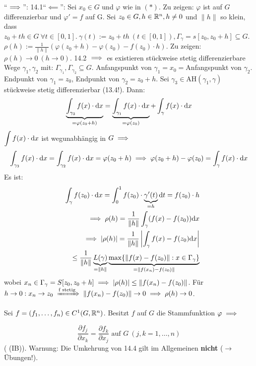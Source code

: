 \documentclass[a4paper,oneside,DIV15,BCOR12mm,chapterprefix=true,headings=onelinechapter]{scrbook}
\begin{document}
\begin{beweis}
"`$\implies$"': 14.1\quad "`$\impliedby$"': Sei $x_0\in G$ und $\varphi$ wie in $(*)$. Zu zeigen: $\varphi$ ist auf $G$ differenzierbar und $\varphi'=f$ auf G. Sei $z_0\in G, h\in\mathbb{R}^n,h\ne 0$ und $\|h\|$ so klein, dass $z_0+th\in G\ \forall t\in[0,1].\ \gamma(t):=z_0+th\ (t\in[0,1]), \Gamma_\gamma=s[z_0, z_0+h]\subseteq G$. $\rho(h):=\frac{1}{\|h\|}(\varphi(z_0+h)-\varphi(z_0)-f(z_0)\cdot h)$. Zu zeigen: $\rho(h)\to 0\ (h\to 0)$. 14.2 $\implies$ es existieren stückweise stetig differenzierbare Wege $\gamma_1, \gamma_2$ mit: $\Gamma_{\gamma_1},\Gamma_{\gamma_2}\subseteq G$. Anfangspunkt von $\gamma_1=x_0=$Anfangspunkt von $\gamma_2$. Endpunkt von $\gamma_1=z_0$, Endpunkt von $\gamma_2=z_0+h$. Sei $\gamma_3\in \text{AH}(\gamma_1,\gamma)$ stückweise stetig differenzierbar (13.4!). Dann: 
$$\underbrace{\displaystyle\int_{\gamma_3}f(x)\cdot\text{d}x}_{=\varphi(z_0+h)}=\underbrace{\displaystyle\int_{\gamma_1}f(x)\cdot\text{d}x}_{=\varphi(z_0)}+\displaystyle\int_{\gamma}f(x)\cdot\text{d}x$$
$\displaystyle\int f(x)\cdot\text{d}x$ ist wegunabhängig in $G\implies$\\
$$\displaystyle\int_{\gamma_3}f(x)\cdot\text{d}x=\displaystyle\int_{\gamma_2}f(x)\cdot\text{d}x=\varphi(z_0+h)\implies\varphi(z_0+h)-\varphi(z_0)=\displaystyle\int_{\gamma}f(x)\cdot\text{d}x$$
Es ist:
\begin{eqnarray*}
&&\displaystyle\int_{\gamma}f(z_0)\cdot\text{d}x=\displaystyle\int_0^1 f(z_0)\cdot\underbrace{\gamma'(t)}_{=h}\text{d}t=f(z_0)\cdot h\\
&&\implies \rho(h)=\frac{1}{\|h\|}\displaystyle\int_{\gamma}(f(x)-f(z_0))\text{d}x\\
&&\implies |\rho(h)|=\frac{1}{\|h\|}\left|\displaystyle\int_{\gamma}f(x)-f(z_0)\text{d}x\right|\\
&&\le\frac{1}{\|h\|}\underbrace{L(\gamma)}_{=\|h\|}\underbrace{\max\{\|f(x)-f(z_0)\|: x\in\Gamma_\gamma\}}_{=\|f(x_n)-f(z_0)\|}
\end{eqnarray*}
wobei $x_n\in\Gamma_\gamma=S[z_0,z_0+h]\implies |\rho(h)|\le\|f(x_n)-f(z_0)\|$. Für $h\to 0: x_n\to z_0\folgtnach{f stetig}\|f(x_n)-f(z_0)\|\to 0\folgt\rho(h)\to 0$.
\end{beweis}

\begin{satz}[Integrabilitätsbedingungen]
Sei $f=(f_1,\ldots, f_n)\in C^1(G,\mathbb{R}^n)$. Besitzt $f$ auf $G$ die Stammfunktion $\varphi\implies$

$$\frac{\partial f_j}{\partial x_k}=\frac{\partial f_k}{\partial x_j}\text{ auf }G\ (j,k=1,\ldots,n)$$
( (IB)). Warnung: Die Umkehrung von 14.4 gilt im Allgemeinen \textbf{nicht} ($\to$ Übungen!).
\end{satz}
\end{document}

